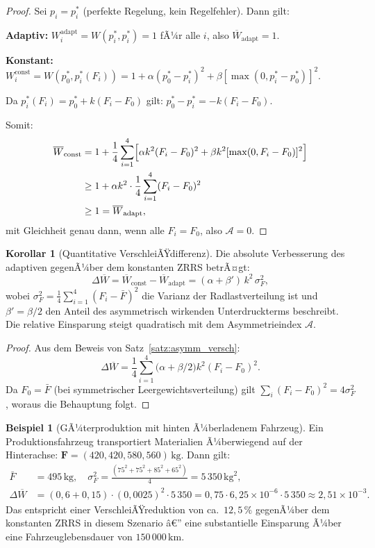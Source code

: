 ﻿\documentclass[a4paper,12pt]{article}
\theoremstyle{definition}
\newtheorem{beispiel}{Beispiel}
\newtheorem{korollar}{Korollar}
\begin{document}
\begin{proof}
Sei $p_i = p^*_i$ (perfekte Regelung, kein Regelfehler). Dann gilt:

\textbf{Adaptiv:}
$W_i^{\text{adapt}} = W(p^*_i, p^*_i) = 1$ fÃ¼r alle $i$, also
$\overline{W}_{\text{adapt}} = 1$.

\textbf{Konstant:}
$W_i^{\text{const}} = W(p^*_0, p^*_i(F_i))
= 1 + \alpha(p^*_0 - p^*_i)^2 + \beta[\max(0, p^*_i - p^*_0)]^2$.

Da $p^*_i(F_i) = p^*_0 + k(F_i - F_0)$ gilt:
$p^*_0 - p^*_i = -k(F_i - F_0)$.

Somit:
\begin{align*}
    \overline{W}_{\text{const}} &= 1 + \frac{1}{4}\sum_{i=1}^{4}
    \Bigl[\alpha k^2(F_i - F_0)^2 + \beta k^2 [\max(0, F_i - F_0)]^2\Bigr]\\
    &\geq 1 + \alpha k^2 \cdot \frac{1}{4}\sum_{i=1}^{4}(F_i - F_0)^2\\
    &\geq 1 = \overline{W}_{\text{adapt}},
\end{align*}
mit Gleichheit genau dann, wenn alle $F_i = F_0$, also $\mathcal{A} = 0$.
\end{proof}

\begin{korollar}[Quantitative VerschleiÃŸdifferenz]
\label{kor:quantdiff}
Die absolute Verbesserung des adaptiven gegenÃ¼ber dem konstanten ZRRS betrÃ¤gt:
\[
    \Delta\overline{W} = \overline{W}_{\text{const}} - \overline{W}_{\text{adapt}}
    = (\alpha + \beta')\, k^2\, \sigma^2_F,
\]
wobei $\sigma^2_F = \frac{1}{4}\sum_{i=1}^{4}(F_i - \bar{F})^2$ die Varianz
der Radlastverteilung ist und $\beta' = \beta/2$ den Anteil des asymmetrisch
wirkenden Unterdruckterms beschreibt. Die relative Einsparung steigt quadratisch
mit dem Asymmetrieindex $\mathcal{A}$.
\end{korollar}

\begin{proof}
Aus dem Beweis von Satz~\ref{satz:asymm_versch}:
\[
    \Delta\overline{W} = \frac{1}{4}\sum_{i=1}^4
    \bigl(\alpha + \beta/2\bigr) k^2 (F_i - F_0)^2.
\]
Da $F_0 = \bar{F}$ (bei symmetrischer Leergewichtsverteilung) gilt
$\sum_i(F_i - F_0)^2 = 4\sigma^2_F$, woraus die Behauptung folgt.
\end{proof}

\begin{beispiel}[GÃ¼terproduktion mit hinten Ã¼berladenem Fahrzeug]
Ein Produktionsfahrzeug transportiert Materialien Ã¼berwiegend auf der
Hinterachse: $\mathbf{F} = (420, 420, 580, 560)\,\text{kg}$. Dann gilt:
\begin{align*}
    \bar{F} &= 495\,\text{kg},\quad
    \sigma^2_F = \frac{(75^2 + 75^2 + 85^2 + 65^2)}{4} = 5\,350\,\text{kg}^2,\\
    \Delta\overline{W} &= (0{,}6 + 0{,}15)\cdot (0{,}0025)^2 \cdot 5\,350
    = 0{,}75 \cdot 6{,}25 \times 10^{-6} \cdot 5\,350
    \approx 2{,}51 \times 10^{-3}.
\end{align*}
Das entspricht einer VerschleiÃŸreduktion von ca.\ $12{,}5\,\%$ gegenÃ¼ber
dem konstanten ZRRS in diesem Szenario â€” eine substantielle Einsparung
Ã¼ber eine Fahrzeuglebensdauer von $150\,000\,\text{km}$.
\end{beispiel}
\end{document}
